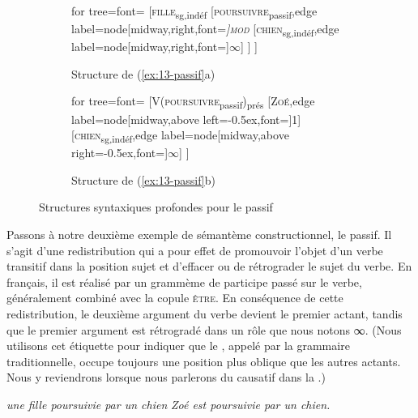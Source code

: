 \begin{figure}
	\begin{subfigure}[b]{0.5\textwidth}
		\centering
		\begin{forest} for tree={font=\normalfont}
			[\textsc{fille}\textsubscript{sg,indéf}
				[\textsc{poursuivre}\textsubscript{passif},edge label={node[midway,right,font=\footnotesize\itshape]{\textsc{mod}}}
					[\textsc{chien}\textsubscript{sg,indéf},edge label={node[midway,right,font=\footnotesize]{$\infty$}}]
				]
			]
		\end{forest}
		\caption{Structure de (\ref{ex:13-passif}a)}
	\end{subfigure}%
	\hfill
	\begin{subfigure}[b]{0.5\textwidth}
		\centering
		\begin{forest} for tree={font=\normalfont}
			[V(\textsc{poursuivre}\textsubscript{passif})\textsubscript{prés}
				[\textsc{Zoé},edge label={node[midway,above left=-0.5ex,font=\footnotesize]{1}}]
				[\textsc{chien}\textsubscript{sg,indéf},edge label={node[midway,above right=-0.5ex,font=\footnotesize]{$\infty$}}]
			]
		\end{forest}
		\caption{Structure de (\ref{ex:13-passif}b)}
	\end{subfigure}
\caption{Structures syntaxiques profondes pour le passif\label{fig:13-passif}}
\end{figure}

Passons à notre deuxième exemple de sémantème constructionnel, le passif. Il s'agit d'une redistribution qui a pour effet de promouvoir l’objet d’un verbe transitif dans la position sujet et d’effacer ou de rétrograder le sujet du verbe. En français, il est réalisé par un grammème de participe passé sur le verbe, généralement combiné avec la copule \textsc{être}. En conséquence de cette redistribution, le deuxième argument du verbe devient le premier actant, tandis que le premier argument est rétrogradé dans un rôle que nous notons ∞. (Nous utilisons cet étiquette pour indiquer que le , appelé  par la grammaire traditionnelle, occupe toujours une position plus oblique que les autres actants. Nous y reviendrons lorsque nous parlerons du causatif dans la .)

\ea\label{ex:13-passif}
\ea \textit{une fille poursuivie par un chien}
\ex \textit{Zoé est poursuivie par un chien.}\z\z\largerpage

